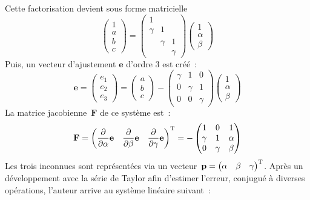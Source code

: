 \documentclass[11pt]{amsart}
\newcommand{\mb}[1]{\mathbf{#1}}
\newcommand{\vb}[1]{\mathbf{#1}}
\begin{document}
Cette factorisation devient sous forme matricielle
$$\begin{pmatrix} 1 \\ a \\ b \\ c \end{pmatrix} = \begin{pmatrix} 1 & & \\ \gamma & 1 & \\ & \gamma & 1 \\ & & \gamma \end{pmatrix}\begin{pmatrix} 1 \\ \alpha \\ \beta \end{pmatrix}$$
Puis, un vecteur d'ajustement $\vb{e}$ d'ordre 3 est cr\'e\'e~:
$$\vb{e} = \begin{pmatrix} e_1 \\ e_2 \\ e_3 \end{pmatrix} = \begin{pmatrix} a \\ b \\ c \end{pmatrix} - \begin{pmatrix} \gamma & 1 & 0 \\ 0 & \gamma & 1 \\ 0 & 0 & \gamma \end{pmatrix}\begin{pmatrix} 1 \\ \alpha \\ \beta \end{pmatrix}$$
La matrice jacobienne~$\mb{F}$ de ce syst\`eme est~:
$$\mb{F} = \begin{pmatrix} \dfrac{\partial}{\partial\alpha}\vb{e} & \dfrac{\partial}{\partial\beta}\vb{e} & \dfrac{\partial}{\partial\gamma}\vb{e} \end{pmatrix}^{\textsc{T}} = -\begin{pmatrix} 1 & 0 & 1 \\ \gamma & 1 & \alpha  \\ 0 & \gamma & \beta \end{pmatrix}$$
Les trois inconnues sont repr\'esent\'ees via un vecteur~$\vb{p} = \begin{pmatrix} \alpha & \beta & \gamma \end{pmatrix}^{\textsc{T}}$. Apr\`es un
d\'eveloppement avec la s\'erie de Taylor afin d'estimer l'erreur, conjugu\'e \`a diverses op\'erations, l'auteur arrive au syst\`eme lin\'eaire suivant~:
\end{document}
